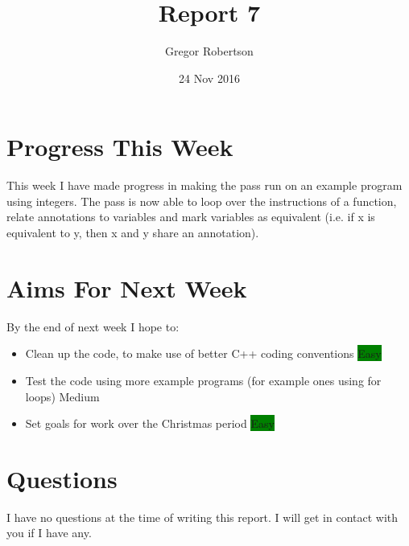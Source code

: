 \documentclass{article}
\title{Report 7}
\author{Gregor Robertson}
\date{24 Nov 2016}
\begin{document}
 
\maketitle
 
\section*{Progress This Week}
This week I have made progress in making the pass run on an example program using integers. The pass is now able to loop over the instructions of a function, relate annotations to variables and mark variables as equivalent (i.e. if x is equivalent to y, then x and y share an annotation). 

\section*{Aims For Next Week}
By the end of next week I hope to:
\begin{itemize}
	\item Clean up the code, to make use of better C++ coding conventions \colorbox{Green}{\color{Black}Easy}
	\item Test the code using more example programs (for example ones using for loops) \colorbox{BurntOrange}{\color{Black}Medium}
	\item Set goals for work over the Christmas period \colorbox{Green}{\color{Black}Easy}
\end{itemize}

\section*{Questions}
I have no questions at the time of writing this report. I will get in contact with
you if I have any.

\medskip
 
\printbibliography
\end{document}
